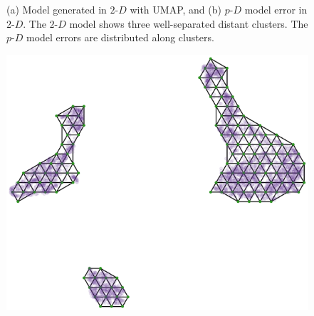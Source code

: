 \documentclass[
  12pt]{article}
\begin{document}
\begin{figure}[H]


\caption{\label{fig-model-pbmc-author}(a) Model generated in
\(2\text{-}D\) with UMAP, and (b) \(p\text{-}D\) model error in
\(2\text{-}D\). The \(2\text{-}D\) model shows three well-separated
distant clusters. The \(p\text{-}D\) model errors are distributed along
clusters.}

\end{figure}%

\begin{figure}[H]

\begin{minipage}{0.25\linewidth}
\includegraphics{figures/pbmc3k/umap_trimesh_plot.png}\end{minipage}%
%
\begin{minipage}{0.25\linewidth}

\end{minipage}
\end{figure}
\end{document}
